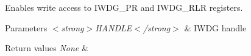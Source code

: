Enables write access to I\+W\+D\+G\+\_\+\+PR and I\+W\+D\+G\+\_\+\+R\+LR registers. 


\begin{DoxyParams}{Parameters}
{\em $<$strong$>$\+H\+A\+N\+D\+L\+E$<$/strong$>$} & I\+W\+DG handle \\
\hline
\end{DoxyParams}

\begin{DoxyRetVals}{Return values}
{\em None} & \\
\hline
\end{DoxyRetVals}

